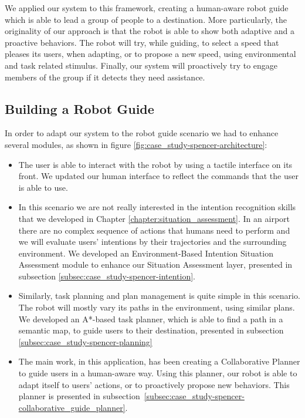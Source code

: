 We applied our system to this framework, creating a human-aware robot guide which is able to lead a group of people to a destination. More particularly, the originality of our approach is that the robot is able to show both adaptive and a proactive behaviors. The robot will try, while guiding, to select a speed that pleases its users, when adapting, or to propose a new speed, using environmental and task related stimulus. Finally, our system will proactively try to engage members of the group if it detects they need assistance. 

\subsection{Building a Robot Guide}
\label{subsec:case_study-spencer-robot_guide}
In order to adapt our system to the robot guide scenario we had to enhance several modules, as shown in figure \ref{fig:case_study-spencer-architecture}: 
\begin{itemize}
\item The user is able to interact with the robot by using a tactile interface on its front. We updated our human interface to reflect the commands that the user is able to use.
\item In this scenario we are not really interested in the intention recognition skills that we developed in Chapter \ref{chapter:situation_assessment}. In an airport there are no complex sequence of actions that humans need to perform and we will evaluate users' intentions by their trajectories and the surrounding environment. We developed an Environment-Based Intention Situation Assessment module to enhance our Situation Assessment layer, presented in subsection \ref{subsec:case_study-spencer-intention}.  
\item Similarly, task planning and plan management is quite simple in this scenario. The robot will mostly vary its paths in the environment, using similar plans. We developed an A*-based task planner, which is able to find a path in a semantic map, to guide users to their destination, presented in subsection \ref{subsec:case_study-spencer-planning} 
\item The main work, in this application, has been creating a Collaborative Planner to guide users in a human-aware way. Using this planner, our robot is able to adapt itself to users' actions, or to proactively propose new behaviors. This planner is presented in subsection~\ref{subsec:case_study-spencer-collaborative_guide_planner}.
\end{itemize} 

